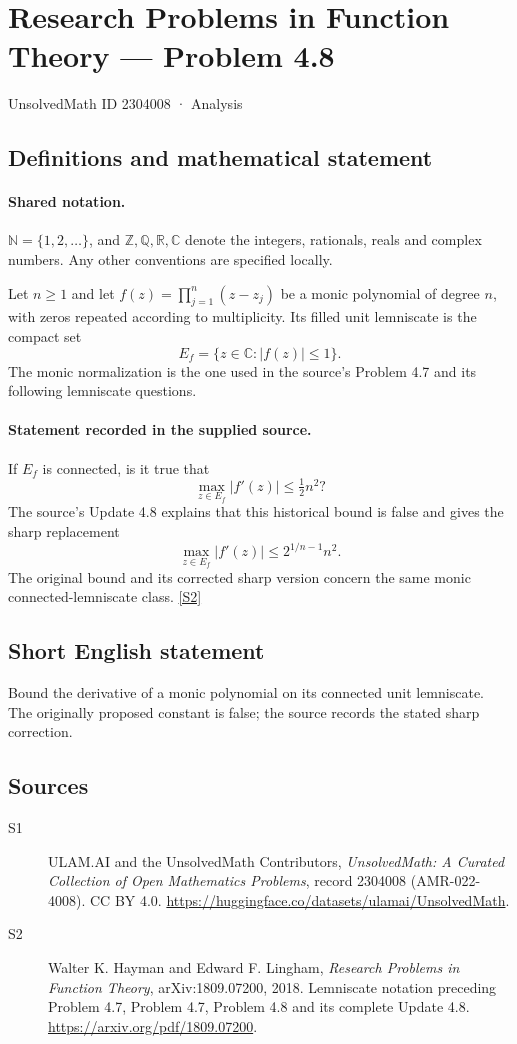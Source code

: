 \documentclass[11pt]{book}
\newcommand{\sref}[2]{\hyperlink{source:#1:#2}{[S#2]}}
\begin{document}
\setcounter{section}{2304007}
\section{Research Problems in Function Theory — Problem 4.8}\label{2304008}
{\small\sffamily UnsolvedMath ID 2304008 · Analysis}
\subsection{Definitions and mathematical statement}

\paragraph{Shared notation.}$\mathbb N=\{1,2,\ldots\}$, and $\mathbb Z,\mathbb Q,\mathbb R,\mathbb C$ denote the integers, rationals, reals and complex numbers. Any other conventions are specified locally.


Let $n\ge1$ and let $f(z)=\prod_{j=1}^n(z-z_j)$ be a monic polynomial of degree $n$, with zeros repeated according to multiplicity. Its filled unit lemniscate is the compact set
\[E_f=\{z\in\mathbb C:|f(z)|\le1\}.
\]
The monic normalization is the one used in the source's Problem 4.7 and its following lemniscate questions.
\paragraph{Statement recorded in the supplied source.}
If $E_f$ is connected, is it true that
\[\max_{z\in E_f}|f'(z)|\le\tfrac12n^2?\]
The source's Update 4.8 explains that this historical bound is false and gives the sharp replacement
\[\max_{z\in E_f}|f'(z)|\le 2^{1/n-1}n^2.
\]
The original bound and its corrected sharp version concern the same monic connected-lemniscate class. \sref{2304008}{2}
\subsection{Short English statement}
Bound the derivative of a monic polynomial on its connected unit lemniscate. The originally proposed constant is false; the source records the stated sharp correction.
\subsection{Sources}
\begin{description}
\item[\hypertarget{source:2304008:1}{S1}] ULAM.AI and the UnsolvedMath Contributors, \emph{UnsolvedMath: A Curated Collection of Open Mathematics Problems}, record 2304008 (AMR-022-4008). CC BY 4.0. \url{https://huggingface.co/datasets/ulamai/UnsolvedMath}.
\item[\hypertarget{source:2304008:2}{S2}] Walter K. Hayman and Edward F. Lingham, \emph{Research Problems in Function Theory}, arXiv:1809.07200, 2018. Lemniscate notation preceding Problem 4.7, Problem 4.7, Problem 4.8 and its complete Update 4.8. \url{https://arxiv.org/pdf/1809.07200}.
\end{description}
\label{end:2304008}
\end{document}
